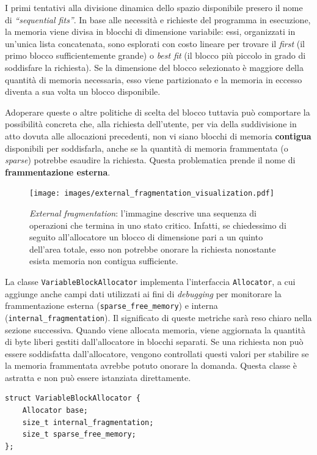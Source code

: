 I primi tentativi alla divisione dinamica dello spazio disponibile presero il nome di \textit{“sequential fits”}. In base alle necessità e richieste del programma in esecuzione, la memoria viene divisa in blocchi di dimensione variabile: essi, organizzati in un'unica lista concatenata, sono esplorati con costo lineare per trovare il \textit{first} (il primo blocco sufficientemente grande) o \textit{best fit} (il blocco più piccolo in grado di soddisfare la richiesta). Se la dimensione del blocco selezionato è maggiore della quantità di memoria necessaria, esso viene partizionato e la memoria in eccesso diventa a sua volta un blocco disponibile. 

Adoperare queste o altre politiche di scelta del blocco tuttavia può comportare la possibilità concreta che, alla richiesta dell'utente, per via della suddivisione in atto dovuta alle allocazioni precedenti, non vi siano blocchi di memoria \textbf{contigua} disponibili per soddisfarla, anche se la quantità di memoria frammentata (o \textit{sparse}) potrebbe esaudire la richiesta. Questa problematica prende il nome di \textbf{frammentazione esterna}.

\begin{figure}[H]
    \centering
    \texttt{[image: images/external\_fragmentation\_visualization.pdf]}
    \caption{\textit{External fragmentation}: l'immagine descrive una sequenza di operazioni che termina in uno stato critico. Infatti, se chiedessimo di seguito all'allocatore un blocco di dimensione pari a un quinto dell'area totale, esso non potrebbe onorare la richiesta nonostante esista memoria non contigua sufficiente.}
    \label{fig:external_fragmentation_visualization}
\end{figure}

La classe \texttt{VariableBlockAllocator} implementa l'interfaccia \texttt{Allocator}, a cui aggiunge anche campi dati utilizzati ai fini di \textit{debugging} per monitorare la frammentazione esterna (\texttt{sparse\_free\_memory}) e interna (\texttt{internal\_fragmentation}). Il significato di queste metriche sarà reso chiaro nella sezione successiva. Quando viene allocata memoria, viene aggiornata la quantità di byte liberi gestiti dall'allocatore in blocchi separati. Se una richiesta non può essere soddisfatta dall'allocatore, vengono controllati questi valori per stabilire se la memoria frammentata avrebbe potuto onorare la domanda. Questa classe è astratta e non può essere istanziata direttamente.

\begin{lstlisting}
struct VariableBlockAllocator {
    Allocator base;
    size_t internal_fragmentation;
    size_t sparse_free_memory;
};
\end{lstlisting}


